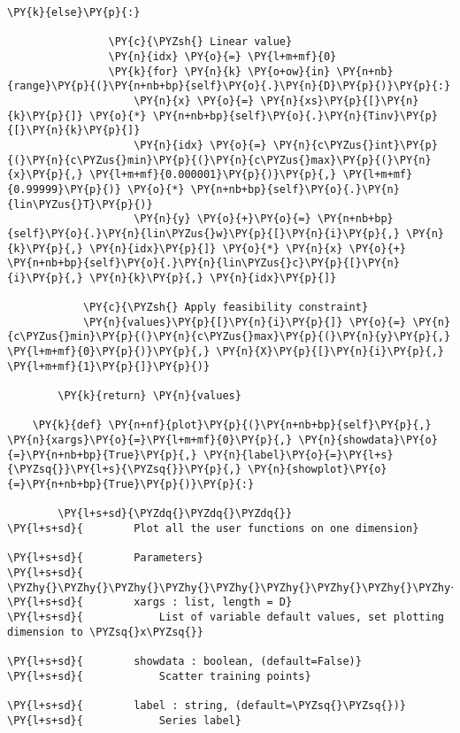 \begin{Verbatim}[commandchars=\\\{\}]
            \PY{k}{else}\PY{p}{:}
                
                \PY{c}{\PYZsh{} Linear value}
                \PY{n}{idx} \PY{o}{=} \PY{l+m+mf}{0}
                \PY{k}{for} \PY{n}{k} \PY{o+ow}{in} \PY{n+nb}{range}\PY{p}{(}\PY{n+nb+bp}{self}\PY{o}{.}\PY{n}{D}\PY{p}{)}\PY{p}{:}
                    \PY{n}{x} \PY{o}{=} \PY{n}{xs}\PY{p}{[}\PY{n}{k}\PY{p}{]} \PY{o}{*} \PY{n+nb+bp}{self}\PY{o}{.}\PY{n}{Tinv}\PY{p}{[}\PY{n}{k}\PY{p}{]}
                    \PY{n}{idx} \PY{o}{=} \PY{n}{c\PYZus{}int}\PY{p}{(}\PY{n}{c\PYZus{}min}\PY{p}{(}\PY{n}{c\PYZus{}max}\PY{p}{(}\PY{n}{x}\PY{p}{,} \PY{l+m+mf}{0.000001}\PY{p}{)}\PY{p}{,} \PY{l+m+mf}{0.99999}\PY{p}{)} \PY{o}{*} \PY{n+nb+bp}{self}\PY{o}{.}\PY{n}{lin\PYZus{}T}\PY{p}{)}
                    \PY{n}{y} \PY{o}{+}\PY{o}{=} \PY{n+nb+bp}{self}\PY{o}{.}\PY{n}{lin\PYZus{}w}\PY{p}{[}\PY{n}{i}\PY{p}{,} \PY{n}{k}\PY{p}{,} \PY{n}{idx}\PY{p}{]} \PY{o}{*} \PY{n}{x} \PY{o}{+} \PY{n+nb+bp}{self}\PY{o}{.}\PY{n}{lin\PYZus{}c}\PY{p}{[}\PY{n}{i}\PY{p}{,} \PY{n}{k}\PY{p}{,} \PY{n}{idx}\PY{p}{]}
                
            \PY{c}{\PYZsh{} Apply feasibility constraint}
            \PY{n}{values}\PY{p}{[}\PY{n}{i}\PY{p}{]} \PY{o}{=} \PY{n}{c\PYZus{}min}\PY{p}{(}\PY{n}{c\PYZus{}max}\PY{p}{(}\PY{n}{y}\PY{p}{,} \PY{l+m+mf}{0}\PY{p}{)}\PY{p}{,} \PY{n}{X}\PY{p}{[}\PY{n}{i}\PY{p}{,} \PY{l+m+mf}{1}\PY{p}{]}\PY{p}{)}
        
        \PY{k}{return} \PY{n}{values}

    \PY{k}{def} \PY{n+nf}{plot}\PY{p}{(}\PY{n+nb+bp}{self}\PY{p}{,} \PY{n}{xargs}\PY{o}{=}\PY{l+m+mf}{0}\PY{p}{,} \PY{n}{showdata}\PY{o}{=}\PY{n+nb+bp}{True}\PY{p}{,} \PY{n}{label}\PY{o}{=}\PY{l+s}{\PYZsq{}}\PY{l+s}{\PYZsq{}}\PY{p}{,} \PY{n}{showplot}\PY{o}{=}\PY{n+nb+bp}{True}\PY{p}{)}\PY{p}{:}
        
        \PY{l+s+sd}{\PYZdq{}\PYZdq{}\PYZdq{}}
\PY{l+s+sd}{        Plot all the user functions on one dimension}

\PY{l+s+sd}{        Parameters}
\PY{l+s+sd}{        \PYZhy{}\PYZhy{}\PYZhy{}\PYZhy{}\PYZhy{}\PYZhy{}\PYZhy{}\PYZhy{}\PYZhy{}\PYZhy{}\PYZhy{}}
\PY{l+s+sd}{        xargs : list, length = D}
\PY{l+s+sd}{            List of variable default values, set plotting dimension to \PYZsq{}x\PYZsq{}}

\PY{l+s+sd}{        showdata : boolean, (default=False)}
\PY{l+s+sd}{            Scatter training points}

\PY{l+s+sd}{        label : string, (default=\PYZsq{}\PYZsq{})}
\PY{l+s+sd}{            Series label}


\end{Verbatim}

